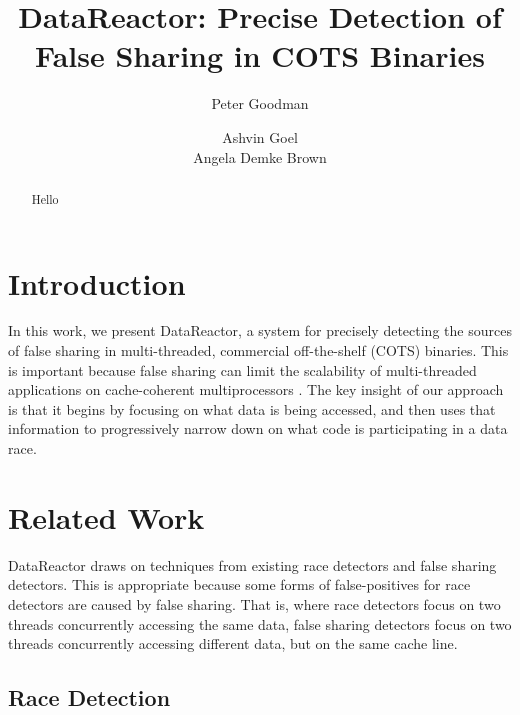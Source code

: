 \documentclass{sig-alternate}
\newcommand{\Toolname}{DataReactor}
\begin{document}
\title{\Large \bf \Toolname: Precise Detection of False Sharing in COTS Binaries}
\author{
\alignauthor
Peter Goodman\\
\and
\alignauthor
Ashvin Goel\\
\alignauthor
Angela Demke Brown\\
}
\maketitle
\begin{abstract}

Hello
\end{abstract}

\section{Introduction}\label{sec:intro}

In this work, we present \Toolname, a system for precisely detecting the sources of false sharing in
multi-threaded, commercial off-the-shelf (COTS) binaries. This is important because false sharing
can limit the scalability of multi-threaded applications on cache-coherent multiprocessors
\cite{ImpactOfFalseSharing}. The key insight of our approach is that it begins by focusing on what
data is being accessed, and then uses that information to progressively narrow down on what code
is participating in a data race.


\section{Related Work}\label{sec:background}
\Toolname{} draws on techniques from existing race detectors and false sharing detectors. This
is appropriate because some forms of false-positives for race detectors are caused by false
sharing. That is, where race detectors focus on two threads concurrently accessing the same
data, false sharing detectors focus on two threads concurrently accessing different data, but
on the same cache line.

\subsection{Race Detection}
\end{document}
